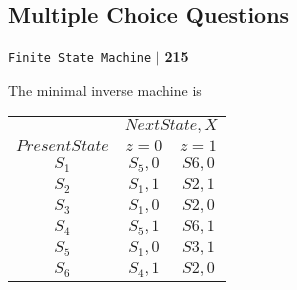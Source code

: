 \documentclass[8pt]{beamer}
\begin{document}
\begin{frame}
 \section*{Multiple Choice Questions}
\begin{flushright}
 \texttt{Finite State Machine} \hspace*{0.1cm}\textbf{$|$} \hspace*{0.1cm} \textbf{215}\hspace*{0.1cm}
\end{flushright}
\vspace*{1cm}

\hspace*{0.5cm} The minimal inverse machine is\\

\vspace*{0.5cm}
\begin{center}
\begin{tabular}{ccc}
 \hline

 \hline

 \hline

 \hline
 & \multicolumn{2}{c}{$Next State,X$}\\
 \cline{2-3}
 $Present State$ &  $z=0$ & $z=1$\\
\hline
$S_1$    &  $S_5, 0$   &  $S6, 0$ \\
$S_2$    &  $S_1, 1$   &  $S2, 1$ \\
$S_3$    &  $S_1, 0$   &  $S2, 0$ \\
$S_4$    &  $S_5, 1$   &  $S6, 1$ \\
$S_5$    &  $S_1, 0$   &  $S3, 1$ \\
$S_6$    &  $S_4, 1$   &  $S2, 0$ \\
 \hline

 \hline

 \hline

 \hline
\end{tabular}
\end{center}

\vspace*{0.4cm}
\end{frame}
\end{document}
